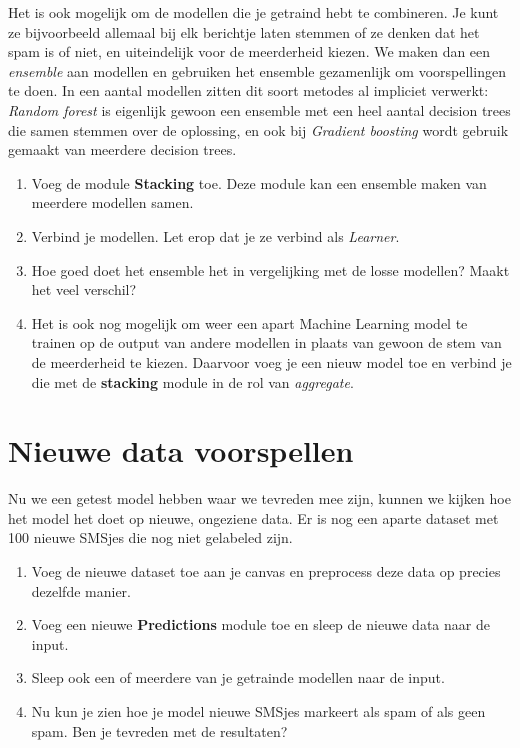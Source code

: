 \documentclass{article}
\newcommand{\tb}[1]{\textbf{#1}}
\begin{document}
Het is ook mogelijk om de modellen die je getraind hebt te combineren. Je kunt ze bijvoorbeeld allemaal bij elk berichtje laten stemmen of ze denken dat het spam is of niet, en uiteindelijk voor de meerderheid kiezen. We maken dan een \textit{ensemble} aan modellen en gebruiken het ensemble gezamenlijk om voorspellingen te doen. In een aantal modellen zitten dit soort metodes al impliciet verwerkt: \textit{Random forest} is eigenlijk gewoon een ensemble met een heel aantal decision trees die samen stemmen over de oplossing, en ook bij \textit{Gradient boosting} wordt gebruik gemaakt van meerdere decision trees.

\begin{enumerate}[resume]
\item Voeg de module \tb{Stacking} toe. Deze module kan een ensemble maken van meerdere modellen samen.
\item Verbind je modellen. Let erop dat je ze verbind als \textit{Learner}.
\item Hoe goed doet het ensemble het in vergelijking met de losse modellen? Maakt het veel verschil?
\item Het is ook nog mogelijk om weer een apart Machine Learning model te trainen op de output van andere modellen in plaats van gewoon de stem van de meerderheid te kiezen. Daarvoor voeg je een nieuw model toe en verbind je die met de \tb{stacking} module in de rol van \textit{aggregate}.
\end{enumerate}

\section{Nieuwe data voorspellen}
Nu we een getest model hebben waar we tevreden mee zijn, kunnen we kijken hoe het model het doet op nieuwe, ongeziene data. Er is nog een aparte dataset met 100 nieuwe SMSjes die nog niet gelabeled zijn.
\begin{enumerate}
\item Voeg de nieuwe dataset toe aan je canvas en preprocess deze data op precies dezelfde manier.
\item Voeg een nieuwe \tb{Predictions} module toe en sleep de nieuwe data naar de input.
\item Sleep ook een of meerdere van je getrainde modellen naar de input.
\item Nu kun je zien hoe je model nieuwe SMSjes markeert als spam of als geen spam. Ben je tevreden met de resultaten?
\end{enumerate}
\end{document}
